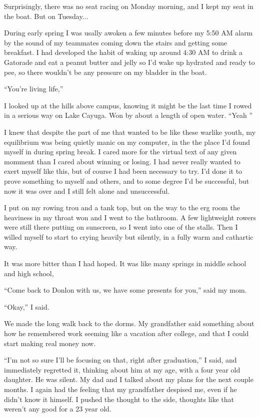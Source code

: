 Surprisingly, there was no seat racing on Monday morning, and I kept my seat in
the boat.  But on Tuesday...

During early spring I was usally awoken a few minutes before my 5:50 AM alarm by
the sound of my teammates coming down the stairs and getting some breakfast.  I
had developed the habit of waking up around 4:30 AM to drink a Gatorade and eat
a peanut butter and jelly so I'd wake up hydrated and ready to pee, so there
wouldn't be any pressure on my bladder in the boat. 

``You're living life,''

I looked up at the hills above campus, knowing it might be the last time I rowed
in a serious way on Lake Cayuga.  Won by about a length of open water.  ``Yeah
'' 

I knew that despite the part of me that wanted to be like these warlike youth,
my equilibrium was being quietly manic on my computer, in the the place I'd
found myself in during spring break.  I cared more for the virtual text of any
given momment than I cared about winning or losing.  I had never really wanted
to exert myself like this, but of course I had been necessary to try.  I'd done
it to prove something to myself and others, and to some degree I'd be
successful, but now it was over and I still felt alone and unsuccessful.

I put on my rowing trou and a tank top, but on the way to the erg room the
heaviness in my throat won and I went to the bathroom.  A few lightweight
rowers were still there putting on sunscreen, so I went into one of the stalls.
Then I willed myself to start to crying heavily but silently, in a fully warm
and cathartic way.  

It was more bitter than I had hoped.  It was like many springs in middle school
and high school, 

``Come back to Donlon with us, we have some presents for you,'' said my mom. 

``Okay,'' I said.  

We made the long walk back to the dorms.  My grandfather said something about
how he remembered work seeming like a vacation after college, and that I could
start making real money now.

``I'm not so sure I'll be focusing on that, right after graduation,'' I said,
and immediately regretted it, thinking about him at my age, with a four year old
daughter.  He was silent.  My dad and I talked about my plans for the next
couple months.  I again had the feeling that my grandfather despised me, even if
he didn't know it himself.  I pushed the thought to the side, thoughts like that
weren't any good for a 23 year old.

